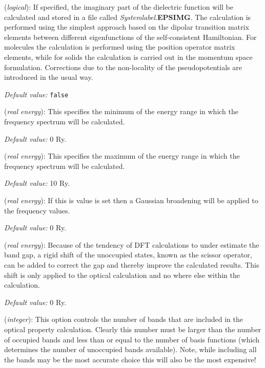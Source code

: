 \documentclass[11pt]{article}
\begin{document}
\begin{description}
\itemsep 10pt
\parsep 0pt

\item[{\bf OpticalCalculation}] ({\it logical}): 
If specified, the imaginary part of the dielectric function
will be calculated and stored in a file called {\it Systemlabel}.{\bf EPSIMG}.
The calculation is performed using the simplest approach based on the
dipolar transition matrix elements between different eigenfunctions
of the self-consistent Hamiltonian. For molecules the calculation 
is performed using the position operator matrix elements, while
for solids the calculation is carried out in the momentum space
formulation.
Corrections due to the non-locality of the pseudopotentials
are introduced in the usual way. 

{\it Default value:} {\tt false}

\item[{\bf Optical.EnergyMinimum}] ({\it real energy}):
This specifies the minimum of the energy range in which
the frequency spectrum will be calculated.

{\it Default value:} 0 Ry.

\item[{\bf Optical.EnergyMaximum}] ({\it real energy}):
This specifies the maximum of the energy range in which
the frequency spectrum will be calculated.

{\it Default value:} 10 Ry.

\item[{\bf Optical.Broaden}] ({\it real energy}):
If this is value is set then a Gaussian broadening will be
applied to the frequency values.

{\it Default value:} 0 Ry.

\item[{\bf Optical.Scissor}] ({\it real energy}):
Because of the tendency of DFT calculations to under estimate
the band gap, a rigid shift of the unoccupied states, known as 
the scissor operator, can be added to correct the gap and
thereby improve the calculated results. This shift is only
applied to the optical calculation and no where else within
the calculation.

{\it Default value:} 0 Ry.

\item[{\bf Optical.NumberOfBands}] ({\it integer}):
This option controls the number of bands that are included in
the optical property calculation. Clearly this number must be
larger than the number of occupied bands and less than or
equal to the number of basis functions (which determines the
number of unoccupied bands available). Note, while including
all the bands may be the most accurate choice this will also
be the most expensive!


\end{description}
\end{document}

